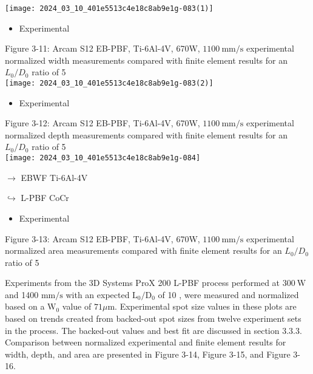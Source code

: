 \documentclass[10pt]{article}
\begin{document}
\begin{center}
\texttt{[image: 2024\_03\_10\_401e5513c4e18c8ab9e1g-083(1)]}
\end{center}

\begin{itemize}
  \item Experimental
\end{itemize}

Figure 3-11: Arcam S12 EB-PBF, Ti-6Al-4V, 670W, $1100 \mathrm{~mm} / \mathrm{s}$ experimental normalized width measurements compared with finite element results for an $L_{0} / D_{0}$ ratio of 5\\
\texttt{[image: 2024\_03\_10\_401e5513c4e18c8ab9e1g-083(2)]}

\begin{itemize}
  \item Experimental
\end{itemize}

Figure 3-12: Arcam S12 EB-PBF, Ti-6Al-4V, 670W, $1100 \mathrm{~mm} / \mathrm{s}$ experimental normalized depth measurements compared with finite element results for an $L_{0} / D_{0}$ ratio of 5\\
\texttt{[image: 2024\_03\_10\_401e5513c4e18c8ab9e1g-084]}

$\rightarrow$ EBWF Ti-6Al-4V

$\hookrightarrow$ L-PBF CoCr

\begin{itemize}
  \item Experimental
\end{itemize}

Figure 3-13: Arcam S12 EB-PBF, Ti-6Al-4V, 670W, $1100 \mathrm{~mm} / \mathrm{s}$ experimental normalized area measurements compared with finite element results for an $L_{0} / D_{0}$ ratio of 5

Experiments from the 3D Systems ProX 200 L-PBF process performed at $300 \mathrm{~W}$ and 1400 $\mathrm{mm} / \mathrm{s}$ with an expected $\mathrm{L}_{0} / \mathrm{D}_{0}$ of 10 , were measured and normalized based on a $\mathrm{W}_{0}$ value of $71 \mu \mathrm{m}$. Experimental spot size values in these plots are based on trends created from backed-out spot sizes from twelve experiment sets in the process. The backed-out values and best fit are discussed in section 3.3.3. Comparison between normalized experimental and finite element results for width, depth, and area are presented in Figure 3-14, Figure 3-15, and Figure 3-16.
\end{document}
